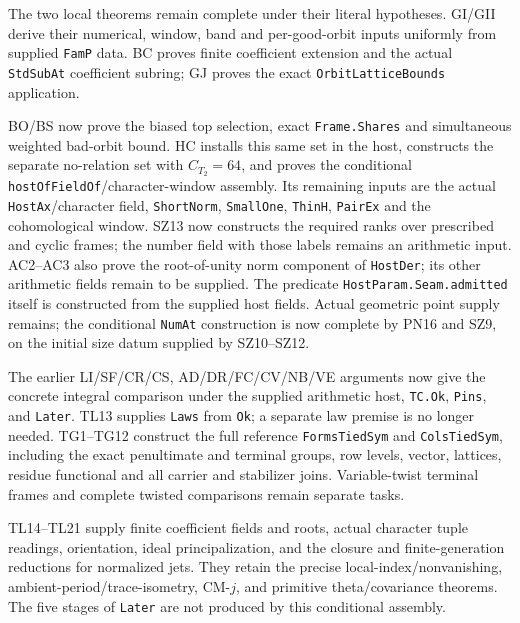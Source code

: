 \documentclass[11pt,a4paper]{article}
\numberwithin{equation}{section}
\theoremstyle{remark}\newtheorem{remark}[theorem]{Remark}
\begin{document}
\begin{description}[style=nextline]
\item[Construct one family realizing all the selected data.]
The two local theorems remain complete under their literal hypotheses.
GI/GII derive their numerical, window, band and per-good-orbit inputs
uniformly from supplied \texttt{FamP} data. BC proves finite coefficient
extension and the actual \texttt{StdSubAt} coefficient subring; GJ proves
the exact \texttt{OrbitLatticeBounds} application.

BO/BS now prove the biased top selection, exact \texttt{Frame.Shares}
and simultaneous weighted bad-orbit bound. HC installs this same set
in the host, constructs the separate no-relation set with $C_{T_2}=64$,
and proves the conditional \texttt{hostOfFieldOf}/character-window
assembly. Its remaining inputs are the actual \texttt{HostAx}/character
field, \texttt{ShortNorm}, \texttt{SmallOne}, \texttt{ThinH},
\texttt{PairEx} and the cohomological window. SZ13 now constructs the
required ranks over prescribed and cyclic frames; the number field with
those labels remains an arithmetic input. AC2--AC3 also prove the
root-of-unity norm component of \texttt{HostDer}; its other arithmetic
fields remain to be supplied.
The predicate \texttt{HostParam.Seam.admitted} itself is constructed
from the supplied host fields. Actual geometric point supply remains;
the conditional \texttt{NumAt} construction is now complete by PN16
and SZ9, on the initial size datum supplied by SZ10--SZ12.

The earlier LI/SF/CR/CS, AD/DR/FC/CV/NB/VE arguments now give the
concrete integral comparison under the supplied arithmetic host,
\texttt{TC.Ok}, \texttt{Pins}, and \texttt{Later}. TL13 supplies
\texttt{Laws} from \texttt{Ok}; a separate law premise is no longer
needed. TG1--TG12 construct the full reference \texttt{FormsTiedSym}
and \texttt{ColsTiedSym}, including the exact penultimate and terminal
groups, row levels, vector, lattices, residue functional and all carrier
and stabilizer joins. Variable-twist terminal frames and complete
twisted comparisons remain separate tasks.

TL14--TL21 supply finite coefficient fields and roots, actual character
tuple readings, orientation, ideal principalization, and the closure
and finite-generation reductions for normalized jets. They retain the
precise local-index/nonvanishing, ambient-period/trace-isometry,
CM-$j$, and primitive theta/covariance theorems. The five stages of
\texttt{Later} are not produced by this conditional assembly.


\end{description}
\end{document}
